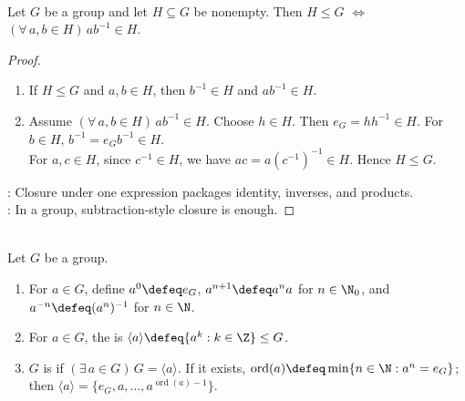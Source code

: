 \begin{proposition} \label{prop:subgroup-test} \\
Let $G$ be a group and let $H\subseteq G$ be nonempty. Then $H\leq G$ $\iff$ $(\forall\,a,b\in H)\,ab^{-1}\in H$.
\begin{proof}
\begin{enumerate}[label=\roman*.]
\setlength{\itemsep}{0pt}
\item[$(\Rightarrow)$] If $H\leq G$ and $a,b\in H$, then $b^{-1}\in H$ and $ab^{-1}\in H$.
\item[$(\Leftarrow)$] Assume $(\forall\,a,b\in H)\,ab^{-1}\in H$. Choose $h\in H$. Then $e_G=hh^{-1}\in H$. For $b\in H$, $b^{-1}=e_Gb^{-1}\in H$.\\
For $a,c\in H$, since $c^{-1}\in H$, we have $ac=a(c^{-1})^{-1}\in H$. Hence $H\leq G$.
\end{enumerate}
: Closure under one expression packages identity, inverses, and products.\\
: In a group, subtraction-style closure is enough.
\end{proof}
\end{proposition}

\begin{definition} \label{def:cyclic-group-and-generated-subgroup} \\
Let $G$ be a group.
\begin{enumerate}[label=(\roman*)]
\setlength{\itemsep}{0pt}
\item For $a\in G$, define $a^0\defeq e_G$, $a^{n+1}\defeq a^na$ for $n\in\N_0$, and $a^{-n}\defeq(a^n)^{-1}$ for $n\in\N$.
\item For $a\in G$, the  is $\langle a\rangle\defeq\{a^k:k\in\Z\}\leq G$.
\item $G$ is  if $(\exists\,a\in G)\,G=\langle a\rangle$. If it exists, $\operatorname{ord}(a)\defeq\min\{n\in\N:a^n=e_G\}$; then $\langle a\rangle=\{e_G,a,\ldots,a^{\operatorname{ord}(a)-1}\}$.
\end{enumerate}
\end{definition}
